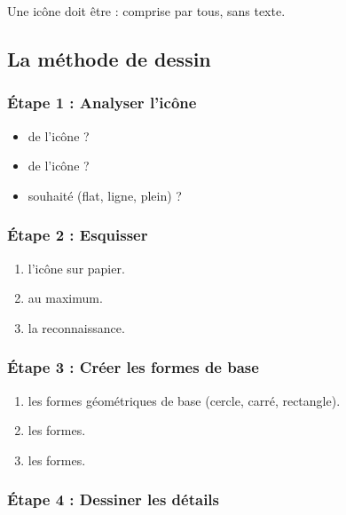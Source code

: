 Une icône doit être  : comprise par tous, sans texte.

\subsection{La méthode de dessin}

\subsubsection{Étape 1 : Analyser l'icône}

\begin{itemize}
    \item {} de l'icône ?
    \item {} de l'icône ?
    \item {} souhaité (flat, ligne, plein) ?
\end{itemize}

\subsubsection{Étape 2 : Esquisser}

\begin{enumerate}
    \item {} l'icône sur papier.
    \item {} au maximum.
    \item {} la reconnaissance.
\end{enumerate}

\subsubsection{Étape 3 : Créer les formes de base}

\begin{enumerate}
    \item {} les formes géométriques de base (cercle, carré, rectangle).
    \item {} les formes.
    \item {} les formes.
\end{enumerate}

\subsubsection{Étape 4 : Dessiner les détails}

